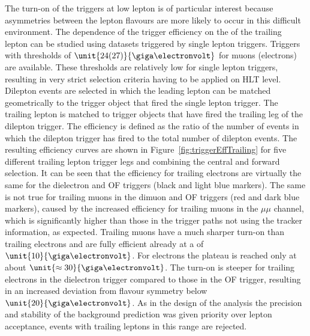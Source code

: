 The turn-on of the triggers at low lepton \pt is of particular interest because asymmetries between the lepton flavours are more likely to occur in this difficult environment. The dependence of the trigger efficiency on the \pt of the trailing lepton can be studied using datasets triggered by single lepton triggers. Triggers with \pt thresholds of $\unit{24(27)}{\giga\electronvolt}$ for muons (electrons) are available. These thresholds are relatively low for single lepton triggers, resulting in very strict selection criteria having to be applied on HLT level. Dilepton events are selected in which the leading lepton can be matched  geometrically to the trigger object that fired the single lepton trigger. The trailing lepton is matched to trigger objects that have fired the trailing leg of the dilepton trigger. The efficiency is defined as the ratio of the number of events in which the dilepton trigger has fired to the total number of dilepton events. The resulting efficiency curves are shown in Figure~\ref{fig:triggerEffTrailing} for five different trailing lepton trigger legs and combining the central and forward selection. It can be seen that the efficiency for trailing electrons are virtually the same for the dielectron and OF triggers (black and light blue markers). The same is not true for trailing muons in the dimuon and OF triggers (red and dark blue markers), caused by the increased efficiency for trailing muons in the $\mu\mu$ channel, which is significantly higher than those in the trigger paths not using the tracker information, as expected. Trailing muons have a much sharper turn-on than trailing electrons and are fully efficient already at a \pt of $\unit{10}{\giga\electronvolt}$. For electrons the plateau is reached only at about $\unit{\approx 30}{\giga\electronvolt}$. The turn-on is steeper for trailing electrons in the dielectron trigger compared to those in the OF trigger, resulting in an increased deviation from flavour symmetry below $\unit{20}{\giga\electronvolt}$. As in the design of the analysis the precision and stability of the background prediction was given priority over lepton acceptance, events with trailing leptons in this \pt range are rejected.  
